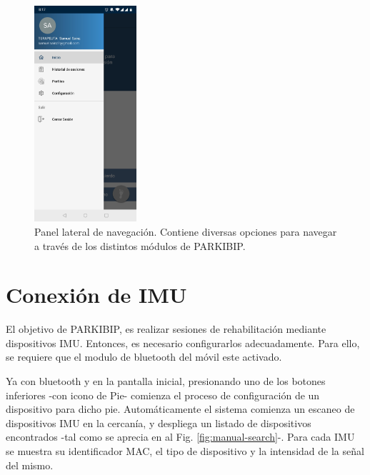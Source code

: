 \begin{figure}[H]
 \centering
 \includegraphics[height=8cm]{TESIS/imagenes/user-manual/manual-navigation.JPG}
 \caption{Panel lateral de navegación. Contiene diversas opciones para navegar a través de los distintos módulos de PARKIBIP.}
 \label{fig:manual-navigation}
\end{figure}

\section{Conexión de IMU}

El objetivo de PARKIBIP, es realizar sesiones de rehabilitación mediante dispositivos IMU. Entonces, es necesario configurarlos adecuadamente. Para ello, se requiere que el modulo de bluetooth del móvil este activado.

Ya con bluetooth y en la pantalla inicial, presionando uno de los botones inferiores -con icono de Pie- comienza el proceso de configuración de un dispositivo para dicho pie. Automáticamente el sistema comienza un escaneo de dispositivos IMU en la cercanía, y despliega un listado de dispositivos encontrados -tal como se aprecia en al Fig. \ref{fig:manual-search}-. Para cada IMU se muestra su identificador MAC, el tipo de dispositivo y la intensidad de la señal del mismo.

\newpage

